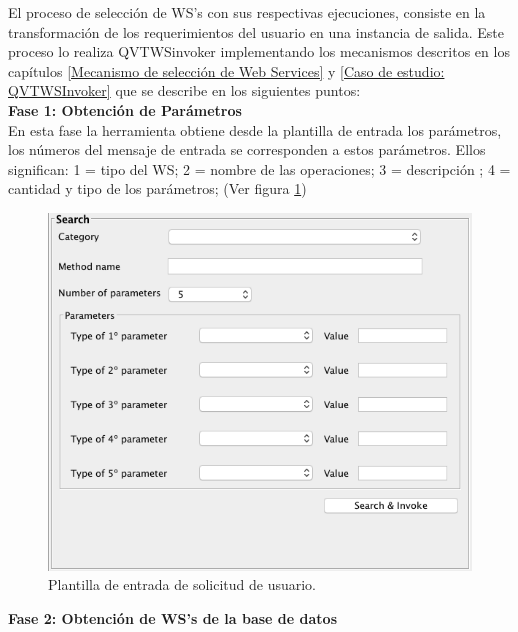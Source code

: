 El proceso de selección de WS's con sus respectivas ejecuciones, consiste en la transformación de los requerimientos del usuario en una instancia de salida. Este proceso lo realiza QVTWSinvoker implementando los mecanismos descritos en los capítulos \ref{Mecanismo de selección de Web Services} y \ref{Caso de estudio: QVTWSInvoker} que se describe en los siguientes puntos:\\

\textbf{Fase 1: Obtención de Parámetros}\\

En esta fase la herramienta obtiene desde la plantilla de entrada los parámetros, los números del mensaje de entrada se corresponden a estos parámetros. Ellos significan: 1 = tipo del WS; 2 = nombre de las operaciones; 3 = descripción ; 4 = cantidad y tipo de los parámetros; (Ver figura \ref{fig:Plantilla de entrada de solicitud de usuario})\\

\begin{figure}[!h] 
	\begin{center}
		\includegraphics [scale=0.60]{imagenes/Plantilla_de_entrada_de_solicitud_de_usuario.png}
	\end{center}
	\caption{Plantilla de entrada de solicitud de usuario.}
	\label{fig:Plantilla de entrada de solicitud de usuario}
\end{figure} 

\textbf{Fase 2: Obtención de WS's de la base de datos}\\

